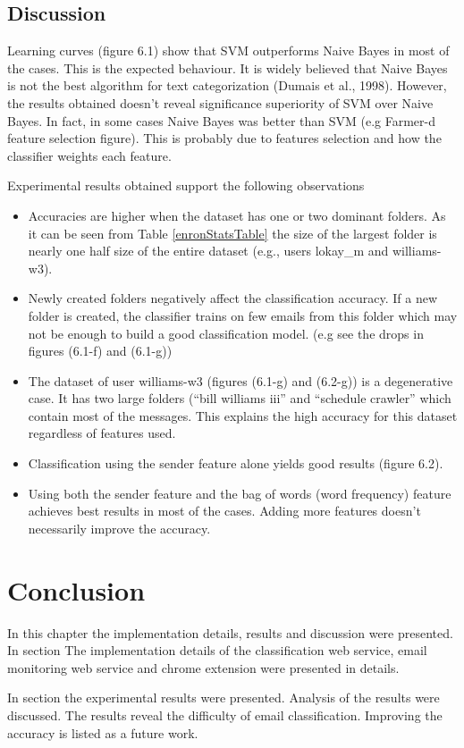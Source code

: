 \subsection{Discussion}
Learning curves (figure 6.1) show that SVM outperforms Naive Bayes in most of 
the cases. This is the expected behaviour. It is widely believed that Naive Bayes 
is not the best algorithm for text categorization (Dumais et al., 1998)\cite{DHS98}.
However, the results obtained doesn't reveal significance superiority of SVM over 
Naive Bayes. In fact, in some cases Naive Bayes was better than SVM (e.g Farmer-d 
feature selection figure). This is probably due to features selection and how 
the classifier weights each feature.


Experimental results obtained support the following observations
\begin{itemize}
  \item Accuracies are higher when the dataset has one or two dominant folders. 
  As it can be seen from Table \ref{enronStatsTable} the size of the largest folder 
  is nearly one half size of the entire dataset (e.g., users lokay\_m and williams-w3).

  \item Newly created folders negatively affect the classification accuracy. If a new 
  folder is created, the classifier trains on few emails from this folder which may 
  not be enough to build a good classification model. (e.g see the drops in figures 
  (6.1-f) and (6.1-g))

  \item The dataset of user williams-w3 (figures (6.1-g) and (6.2-g)) is a degenerative 
  case. It has two large folders (``bill williams iii'' and ``schedule crawler'' which 
  contain most of the messages. This explains the high accuracy for this dataset regardless 
  of features used.

  \item Classification using the sender feature alone yields good results (figure 6.2).

  \item Using both the sender feature and the bag of words (word frequency) feature 
  achieves best results in most of the cases. Adding more features doesn't necessarily 
  improve the accuracy.

\end{itemize}

\section{Conclusion}
\label{sec:conclusion_6}
In this chapter the implementation details, results and discussion were presented. In section 
\label{sec:6_imp_details} The implementation details of the classification web service, 
email monitoring web service and chrome extension were presented in details.

In section \label{sec:6_results_discussion} the experimental results were presented.
Analysis of the results were discussed. The results reveal the difficulty of email 
classification. Improving the accuracy is listed as a future work.

